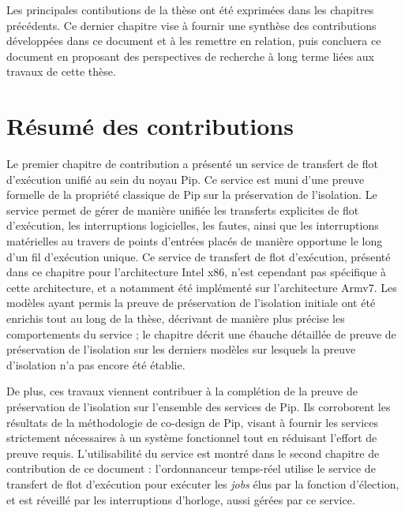 	Les principales contibutions de la thèse ont été exprimées dans les chapitres précédents. Ce dernier chapitre vise à fournir une synthèse des contributions développées dans ce document et à les remettre en relation, puis concluera ce document en proposant des perspectives de recherche à long terme liées aux travaux de cette thèse.

	\section{Résumé des contributions}

		Le premier chapitre de contribution a présenté un service de transfert de flot d'exécution unifié au sein du noyau Pip. Ce service est muni d'une preuve formelle de la propriété classique de Pip sur la préservation de l'isolation. Le service permet de gérer de manière unifiée les transferts explicites de flot d'exécution, les interruptions logicielles, les fautes, ainsi que les interruptions matérielles au travers de points d'entrées placés de manière opportune le long d'un fil d'exécution unique. Ce service de transfert de flot d'exécution, présenté dans ce chapitre pour l'architecture Intel x86, n'est cependant pas spécifique à cette architecture, et a notamment été implémenté sur l'architecture Armv7.
		Les modèles ayant permis la preuve de préservation de l'isolation initiale ont été enrichis tout au long de la thèse, décrivant de manière plus précise les comportements du service ; le chapitre décrit une ébauche détaillée de preuve de préservation de l'isolation sur les derniers modèles sur lesquels la preuve d'isolation n'a pas encore été établie.

		De plus, ces travaux viennent contribuer à la complétion de la preuve de préservation de l'isolation sur l'ensemble des services de Pip. Ils corroborent les résultats de la méthodologie de co-design de Pip, visant à fournir les services strictement nécessaires à un système fonctionnel tout en réduisant l'effort de preuve requis. L'utilisabilité du service est montré dans le second chapitre de contribution de ce document : l'ordonnanceur temps-réel utilise le service de transfert de flot d'exécution pour exécuter les \emph{jobs} élus par la fonction d'élection, et est réveillé par les interruptions d'horloge, aussi gérées par ce service.

